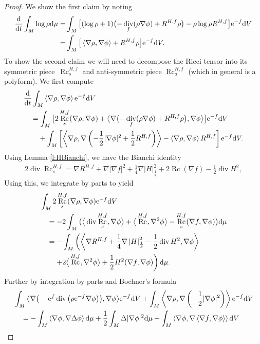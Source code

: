 \documentclass[11pt]{article}
\numberwithin{equation}{section}
\numberwithin{equation}{section}
\newcommand{\N}{\nabla}
\newcommand{\IP}[1]{\left<#1\right>}
\newcommand{\wnorm}[1]{\left|#1\right|^2_{\frac1k}}
\DeclareMathOperator{\Rc}{Rc}
\DeclareMathOperator{\divg}{div}
\begin{document}
\begin{proof}
	We show the first claim by noting
	\begin{align*}
	\frac{{\rm d}}{{\rm d}t} \int_M \log\rho {\rm d}\mu
	=&\int_M \big[ (\log\rho+1)\bigl(-\divg_f(\rho \N\phi)+R^{H,f}\rho\bigr)-\rho\log\rho R^{H,f} \big] {\rm e}^{-f} {\rm d}V\\
	=&\int_M \big[ \IP{\N\rho,\N\phi}+R^{H,f}\rho \big]{\rm e}^{-f} {\rm d}V.
	\end{align*}
	To show the second claim we will need to decompose the Ricci tensor into its symmetric piece~$\Rc^{H,f}_s$ and anti-symmetric piece $\Rc^{H,f}_a$ (which in general is a polyform). We first compute
	\begin{align*}
	&\frac{{\rm d}}{{\rm d}t} \int_M \IP{\N\rho,\N\phi}{\rm e}^{-f} {\rm d}V\\
&\quad=\int_M \big[ 2\Rc^{H,f}_s(\N\rho,\N\phi) + \big\langle\N\bigl(- \divg_f (\rho \N \phi) +R^{H,f}\rho\bigr),\N \phi\big\rangle \big] {\rm e}^{-f} {\rm d}V \\
	&\quad\phantom{={}}{}+\int_M \left[ \IP{\N\rho,\N \left(-\frac12|\N\phi|^2+\frac12R^{H,f} \right)} - \IP{\N\rho,\N\phi} R^{H,f} \right] {\rm e}^{-f} {\rm d}V.
	\end{align*}
 Using Lemma \ref{l:HBianchi}, we have the Bianchi identity
 \begin{align*}
 	 2\divg \Rc^{H,f}_s=\N R^{H,f}+\N|\N f|^2+\frac1{4}\N\wnorm{H}+2\Rc(\N f)-\frac12\divg H^2,
	\end{align*}
 Using this, we integrate by parts to yield
 \begin{align*}
	&\int_M 2 \Rc^{H,f}_s (\N\rho,\N\phi){\rm e}^{-f} {\rm d}V\\
 &\quad=-2\int_M \big(\big\langle\divg \Rc^{H,f}_s,\N\phi\big\rangle+\big\langle\Rc^{H,f},\N^2\phi\big\rangle- \Rc^{H,f}_s(\N f,\N\phi) \big) {\rm d}\mu\\
	&\quad=-\int_M \left(\IP{\N R^{H,f}+\frac1{4}\N\wnorm{H}-\frac12\divg H^2,\N\phi}\right.\\
&\phantom{\quad={}}{}\left.+2\big\langle\Rc^{H,f},\N^2\phi\big\rangle+\frac12 H^2(\N f,\N\phi) \right) {\rm d}\mu.
\end{align*}
 Further by integration by parts and Bochner's formula
 \begin{align*}
	&\int_M \big\langle\N\big(-{\rm e}^{f}\divg\big(\rho {\rm e}^{-f}\N\phi\big)\big),\N \phi\big\rangle{\rm e}^{-f} {\rm d}V +\int_M \IP{\N\rho,\N\left(-\frac12|\N\phi|^2\right)}{\rm e}^{-f} {\rm d}V\\
	&\quad=-\int_M \IP{\N\phi,\N\Delta\phi} {\rm d}\mu+\frac12\int_M \Delta|\N\phi|^2 {\rm d}\mu +\int_M \IP{\N \phi,\N\IP{\N f,\N\phi}} {\rm d}V\\

\end{align*}
\end{proof}
\end{document}
